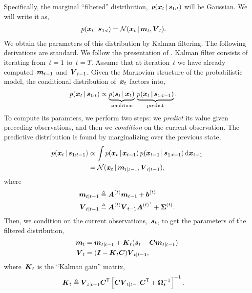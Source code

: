 Specifically, the marginal ``filtered'' distribution,~${p(\boldsymbol{x}_t \,|\,
  \boldsymbol{s}_{1:t})}$ will be Gaussian. We will write it as,
\begin{align*}
  p(\boldsymbol{x}_t \,|\, \boldsymbol{s}_{1:t}) &= \mathcal{N}(\boldsymbol{x}_t \,|\, \boldsymbol{m}_t, \boldsymbol{V}_t).
\end{align*}
We obtain the parameters of this distribution by Kalman filtering.
The following derivations are standard. We follow the presentation of
\citet[Chapter 18]{murphy2012probabilistic}.  Kalman filter consists
of iterating from~${t=1}$ to~${t=T}$. Assume that at iteration~$t$ we
have already computed~$\boldsymbol{m}_{t-1}$ and~$\boldsymbol{V}_{t-1}$. Given the
Markovian structure of the probabilistic model, the
conditional distribution of~$\boldsymbol{x}_t$ factors into,
\begin{align*}
  p(\boldsymbol{x}_t \,|\, \boldsymbol{s}_{1:t})
  &\propto
  \underbrace{p(\boldsymbol{s}_t \,|\, \boldsymbol{x}_t)}_{\text{condition}} \,
  \underbrace{p(\boldsymbol{x}_{t} \,|\, \boldsymbol{s}_{1:t-1})}_{\text{predict}}.
\end{align*}
To compute its paramters, we perform two steps: we \emph{predict} its
value given preceding observations, and then we
\emph{condition} on the current observation. The predictive
distribution is found by marginalizing over the previous state,
\begin{align*}
  p(\boldsymbol{x}_t \,|\, \boldsymbol{s}_{1:t-1})
  &\propto  \int p(\boldsymbol{x}_t \,|\, \boldsymbol{x}_{t-1}) \, p(\boldsymbol{x}_{t-1} \,|\, \boldsymbol{s}_{1:t-1}) \, \mathrm{d} \boldsymbol{x}_{t-1} \\
  &= \mathcal{N}(\boldsymbol{x}_t \,|\, \boldsymbol{m}_{t|t-1}, \boldsymbol{V}_{t|t-1}),
\end{align*}
where
\begin{align*}
  \boldsymbol{m}_{t|t-1} &\triangleq \boldsymbol{A}^{(t)} \boldsymbol{m}_{t-1} + \boldsymbol{b}^{(t)} \\
  \boldsymbol{V}_{t|t-1} &\triangleq \boldsymbol{A}^{(t)} \boldsymbol{V}_{t-1}\boldsymbol{A}^{(t)^{\mathsf{T}}} + \boldsymbol{\Sigma}^{(t)}.
\end{align*}
Then, we condition on the current observations,~$\boldsymbol{s}_t$, to get the
parameters of the filtered distribution,
\begin{align*}
  \boldsymbol{m}_t &= \boldsymbol{m}_{t|t-1} + \boldsymbol{K}_t (\boldsymbol{s}_t - \boldsymbol{C} \boldsymbol{m}_{t|t-1}) \\
  \boldsymbol{V}_t &= (\boldsymbol{I} - \boldsymbol{K}_t \boldsymbol{C}) \boldsymbol{V}_{t|t-1},
\end{align*}
where~$\boldsymbol{K}_t$ is the ``Kalman gain'' matrix,
\begin{align*}
  \boldsymbol{K}_t &\triangleq \boldsymbol{V}_{t|t-1} \boldsymbol{C}^{\mathsf{T}} \left[ \boldsymbol{C} \boldsymbol{V}_{t|t-1} \boldsymbol{C}^{\mathsf{T}} + \boldsymbol{\Omega}_t^{-1} \right]^{-1}.
\end{align*}


